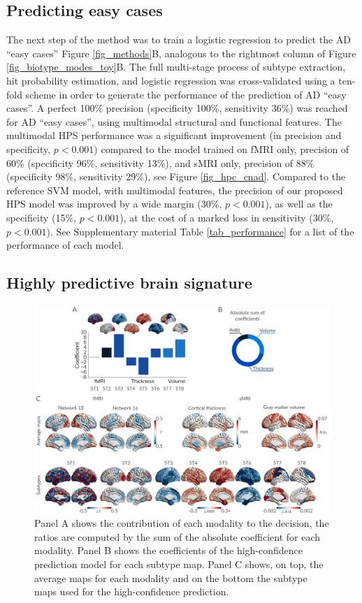 \documentclass[authoryear]{elsarticle}
\begin{document}
\subsection*{Predicting easy cases}
The next step of the method was to train a logistic regression \citep{Fan2008} to predict the AD ``easy cases'' Figure \ref{fig_methods}B, analogous to the rightmost column of Figure \ref{fig_biotype_modes_toy}B. The full multi-stage process of subtype extraction, hit probability estimation, and logistic regression was cross-validated using a ten-fold scheme in order to generate the performance of the prediction of AD ``easy cases''. A perfect 100\% precision (specificity 100\%, sensitivity 36\%) was reached for AD ``easy cases'', using multimodal structural and functional features. The multimodal HPS performance was a significant improvement (in precision and specificity, $p<0.001$) compared to the model trained on fMRI only, precision of 60\% (specificity 96\%, sensitivity 13\%), and sMRI only, precision of 88\% (specificity 98\%, sensitivity 29\%), see Figure \ref{fig_hpc_cnad}. Compared to the reference SVM model, with multimodal features, the precision of our proposed HPS model was improved by a wide margin (30\%, $p<0.001$),  as well as the specificity (15\%, $p<0.001$), at the cost of a marked loss in sensitivity (30\%, $p<0.001$). See Supplementary material Table \ref{tab_performance} for a list of the performance of each model.
\subsection*{Highly predictive brain signature}
\begin{figure}[ht]
\centering
\includegraphics[width=\linewidth]{figures/confidence_features.png}
\caption{Panel A shows the contribution of each modality to the decision, the ratios are computed by the sum of the absolute coefficient for each modality. Panel B shows the coefficients of the high-confidence prediction model for each subtype map. Panel C shows, on top, the average maps for each modality and on the bottom the subtype maps used for the high-confidence prediction.}
\label{fig_features_maps}
\end{figure}
\end{document}
